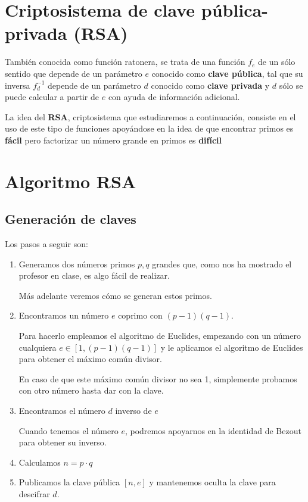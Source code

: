 \section{Criptosistema de clave pública-privada (RSA)}

\begin{defn}
También conocida como función ratonera, se trata de una función $f_e$ de un sólo sentido que depende de un parámetro $e$ conocido como \textbf{clave pública}, tal que su inversa $f^{-1}_d$ depende de un parámetro $d$ conocido como \textbf{clave privada} y $d$ sólo se puede calcular a partir de $e$ con ayuda de información adicional.
\end{defn}

La idea del \textbf{RSA}, criptosistema que estudiaremos a continuación, consiste en el uso de este tipo de funciones apoyándose en la idea de que encontrar primos es \textbf{fácil} pero factorizar un número grande en primos es \textbf{difícil}

\section{Algoritmo RSA}
\subsection{Generación de claves}
Los pasos a seguir son:
\begin{enumerate}
\item Generamos dos números primos $p,q$ grandes que, como nos ha mostrado el profesor en clase, es algo fácil de realizar.

Más adelante veremos cómo se generan estos primos.

\item Encontramos un número $e$ coprimo con $(p-1)(q-1)$.

Para hacerlo empleamos el algoritmo de Euclides, empezando con un número cualquiera $e\in [1, (p-1)(q-1)]$ y le aplicamos el algoritmo de Euclides para obtener el máximo común divisor.

En caso de que este máximo común divisor no sea 1, simplemente probamos con otro número hasta dar con la clave.

\item Encontramos el número $d$ inverso de $e$

Cuando tenemos el número $e$, podremos apoyarnos en la identidad de Bezout para obtener su inverso.

\item Calculamos $n=p\cdot q$

\item Publicamos la clave pública $[n,e]$ y mantenemos oculta la clave para descifrar $d$.
\end{enumerate}

